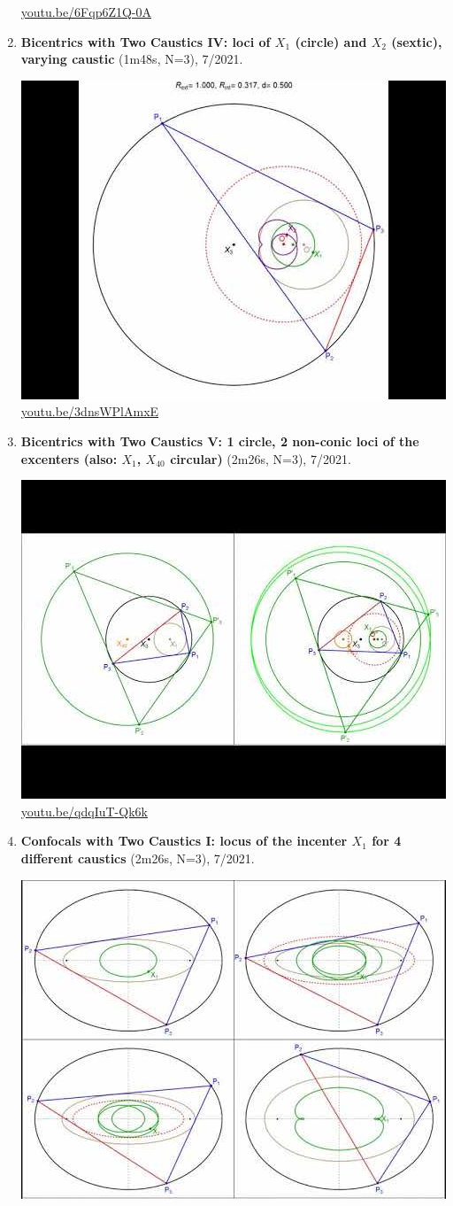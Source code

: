 \documentclass[12pt]{amsart}
\begin{document}
\begin{enumerate}[resume]
\begin{center}
\href{https://youtu.be/6Fqp6Z1Q-0A}{\url{youtu.be/6Fqp6Z1Q-0A}}\end{center}
% 
\item \textbf{Bicentrics with Two Caustics IV: loci of $X_{1}$ (circle) and $X_{2}$ (sextic), varying caustic} (1m48s, N=3), 7/2021. 
\begin{center}\includegraphics[width=.5\textwidth]{pics/3dnsWPlAmxE.jpg} \\ 
\href{https://youtu.be/3dnsWPlAmxE}{\url{youtu.be/3dnsWPlAmxE}}\end{center}
% 
\item \textbf{Bicentrics with Two Caustics V: 1 circle, 2 non-conic loci of the excenters (also: $X_{1}$, $X_{40}$ circular)} (2m26s, N=3), 7/2021. 
\begin{center}\includegraphics[width=.5\textwidth]{pics/qdqIuT-Qk6k.jpg} \\ 
\href{https://youtu.be/qdqIuT-Qk6k}{\url{youtu.be/qdqIuT-Qk6k}}\end{center}
% 
\item \textbf{Confocals with Two Caustics I: locus of the incenter $X_{1}$ for 4 different caustics} (2m26s, N=3), 7/2021. 
\begin{center}\includegraphics[width=.5\textwidth]{pics/C14TL430UBc.jpg} \\ 

\end{center}
\end{enumerate}
\end{document}
